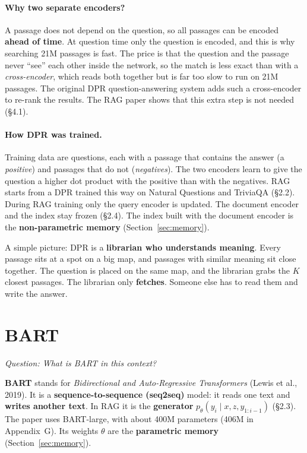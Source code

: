 \documentclass[11pt]{article}
\newcommand{\question}[1]{\noindent\textit{Question: #1}\par\medskip}
\begin{document}
\paragraph{Why two separate encoders?}
A passage does not depend on the question, so all passages can be encoded \textbf{ahead of time}. At question time only the question is encoded, and this is why searching 21M passages is fast. The price is that the question and the passage never ``see'' each other inside the network, so the match is less exact than with a \emph{cross-encoder}, which reads both together but is far too slow to run on 21M passages. The original DPR question-answering system adds such a cross-encoder to re-rank the results. The RAG paper shows that this extra step is not needed (\S4.1).

\paragraph{How DPR was trained.}
Training data are questions, each with a passage that contains the answer (a \emph{positive}) and passages that do not (\emph{negatives}). The two encoders learn to give the question a higher dot product with the positive than with the negatives. RAG starts from a DPR trained this way on Natural Questions and TriviaQA (\S2.2). During RAG training only the query encoder is updated. The document encoder and the index stay frozen (\S2.4). The index built with the document encoder is the \textbf{non-parametric memory} (Section~\ref{sec:memory}).

A simple picture: DPR is a \textbf{librarian who understands meaning}. Every passage sits at a spot on a big map, and passages with similar meaning sit close together. The question is placed on the same map, and the librarian grabs the $K$ closest passages. The librarian only \textbf{fetches}. Someone else has to read them and write the answer.

\section{BART}\label{sec:bart}
\question{What is BART in this context?}

\textbf{BART} stands for \emph{Bidirectional and Auto-Regressive Transformers} (Lewis et al., 2019). It is a \textbf{sequence-to-sequence (seq2seq)} model: it reads one text and \textbf{writes another text}. In RAG it is the \textbf{generator} $p_\theta(y_i \mid x, z, y_{1:i-1})$ (\S2.3). The paper uses BART-large, with about 400M parameters (406M in Appendix~G). Its weights $\theta$ are the \textbf{parametric memory} (Section~\ref{sec:memory}).
\end{document}

